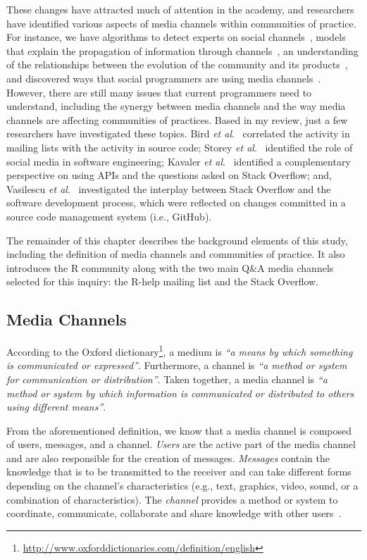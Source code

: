 \documentclass{sig-alternate-05-2015}
\begin{document}
	These changes have attracted much of attention in the academy, and researchers have identified various aspects of media channels within communities of practice.
	For instance, we have algorithms to detect experts on social channels~\cite{Pal2011a,Pal2012a}, models that explain the propagation of information through channels~\cite{Jin2013, Jiang2013}, an understanding of the relationships between the evolution of the community and its products~\cite{German2013}, and discovered ways that social programmers are using media channels~\cite{Sowe2008a, Singh2009, Parnin2013}. 
	However, there are still many issues that current programmers need to understand, including the synergy between media channels and the way media channels are affecting communities of practices. 
	Based in my review, just a few researchers have investigated these topics. 
	Bird \textit{et al}.~\cite{Bird2006} correlated the activity in mailing lists with the activity in source code;
	Storey \textit{et al}.~\cite{Storey2014, Storey2010} identified the role of social media in software engineering;
	Kavaler \textit{et al}.~\cite{Kavaler2013} identified a complementary perspective on using APIs and the questions asked on Stack Overflow;
	and, Vasilescu \textit{et al}.~\cite{Vasilescu2013a} investigated the interplay between Stack Overflow and the software development process, which were reflected on changes committed in a source code management system (i.e., GitHub).

	The remainder of this chapter describes the background elements of this study, including the definition of media channels and communities of practice. It also introduces the R community along with the two main Q\&A media channels selected for this inquiry: the R-help mailing list and the Stack Overflow. 

\subsection{Media Channels}

	According to the Oxford dictionary\footnote{\url{http://www.oxforddictionaries.com/definition/english}}, a medium is \textit{``a means by which something is communicated or expressed''}. 
	Furthermore, a channel is \textit{``a method or system for communication or distribution''}.
	Taken together, a media channel is \textit{``a method or system by which information is communicated or distributed to others using different means''}.

	From the aforementioned definition, we know that a media channel is composed of users, messages, and a channel. 
	\textit{Users} are the active part of the media channel and are also responsible for the creation of messages. 
	\textit{Messages} contain the knowledge that is to be transmitted to the receiver and can take different forms depending on the channel's characteristics (e.g., text, graphics, video, sound, or a combination of characteristics).
	The \textit{channel} provides a method or system to coordinate, communicate, collaborate and share knowledge with other users~\cite{Storey2014}.
\end{document}

